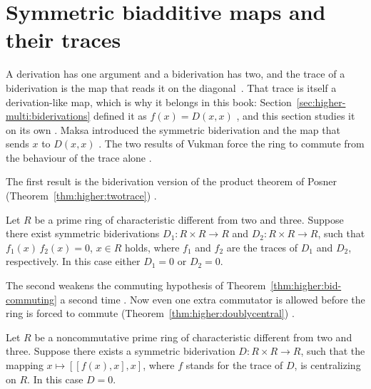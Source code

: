\section{Symmetric biadditive maps and their traces}\label{sec:higher-multi:symmetric-maps}

A derivation has one argument and a biderivation has two, and the trace of a
biderivation is the map that reads it on the diagonal~\cite[p.~181]{Vukman1990Two}. That trace is itself a
derivation-like map, which is why it belongs in this book: Section~\ref{sec:higher-multi:biderivations}
defined it as $f(x)=D(x,x)$ \cite[p.~245]{Vukman1989Bid}, and this section
studies it on its own \cite[p.~181]{Vukman1990Two}. Maksa
introduced the symmetric biderivation and the map that sends $x$ to $D(x,x)$
\cite[references~4 and~5]{Vukman1990Two}. The two results of Vukman force the
ring to commute from the behaviour of the trace alone
\cite[p.~181]{Vukman1990Two}.

The first result is the biderivation version of the product theorem of
Posner (Theorem~\ref{thm:higher:twotrace}) \cite[p.~181]{Vukman1990Two}.

\begin{theorem}\label{thm:higher:twotrace}
Let $R$ be a prime ring of characteristic different from two and three.
Suppose there exist symmetric biderivations $D_1\colon R\times R\to R$ and
$D_2\colon R\times R\to R$, such that $f_1(x)\,f_2(x)=0$, $x\in R$ holds,
where $f_1$ and $f_2$ are the traces of $D_1$ and $D_2$, respectively. In
this case either $D_1=0$ or $D_2=0$.
\end{theorem}

The second weakens the commuting hypothesis of
Theorem~\ref{thm:higher:bid-commuting} a second time
\cite[p.~187]{Vukman1990Two}. Now even one extra commutator is allowed before
the ring is forced to commute (Theorem~\ref{thm:higher:doublycentral})
\cite[p.~187]{Vukman1990Two}.

\begin{theorem}\label{thm:higher:doublycentral}
Let $R$ be a noncommutative prime ring of characteristic different from two
and three. Suppose there exists a symmetric biderivation $D\colon R\times
R\to R$, such that the mapping $x\mapsto [[f(x),x],x]$, where $f$ stands
for the trace of $D$, is centralizing on $R$. In this case $D=0$.
\end{theorem}

